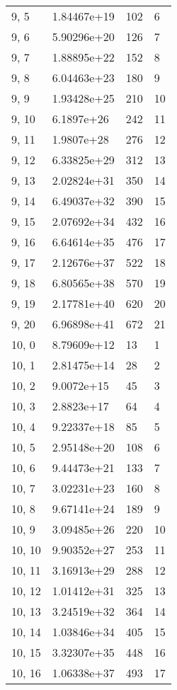 \begin{table}
\begin{tabular}{llll}
9, 5   &  1.84467e+19 &  102 &     6 \\
9, 6   &  5.90296e+20 &  126 &     7 \\
9, 7   &  1.88895e+22 &  152 &     8 \\
9, 8   &  6.04463e+23 &  180 &     9 \\
9, 9   &  1.93428e+25 &  210 &    10 \\
9, 10  &   6.1897e+26 &  242 &    11 \\
9, 11  &   1.9807e+28 &  276 &    12 \\
9, 12  &  6.33825e+29 &  312 &    13 \\
9, 13  &  2.02824e+31 &  350 &    14 \\
9, 14  &  6.49037e+32 &  390 &    15 \\
9, 15  &  2.07692e+34 &  432 &    16 \\
9, 16  &  6.64614e+35 &  476 &    17 \\
9, 17  &  2.12676e+37 &  522 &    18 \\
9, 18  &  6.80565e+38 &  570 &    19 \\
9, 19  &  2.17781e+40 &  620 &    20 \\
9, 20  &  6.96898e+41 &  672 &    21 \\
10, 0  &  8.79609e+12 &   13 &     1 \\
10, 1  &  2.81475e+14 &   28 &     2 \\
10, 2  &   9.0072e+15 &   45 &     3 \\
10, 3  &   2.8823e+17 &   64 &     4 \\
10, 4  &  9.22337e+18 &   85 &     5 \\
10, 5  &  2.95148e+20 &  108 &     6 \\
10, 6  &  9.44473e+21 &  133 &     7 \\
10, 7  &  3.02231e+23 &  160 &     8 \\
10, 8  &  9.67141e+24 &  189 &     9 \\
10, 9  &  3.09485e+26 &  220 &    10 \\
10, 10 &  9.90352e+27 &  253 &    11 \\
10, 11 &  3.16913e+29 &  288 &    12 \\
10, 12 &  1.01412e+31 &  325 &    13 \\
10, 13 &  3.24519e+32 &  364 &    14 \\
10, 14 &  1.03846e+34 &  405 &    15 \\
10, 15 &  3.32307e+35 &  448 &    16 \\
10, 16 &  1.06338e+37 &  493 &    17 \\

\end{tabular}
\end{table}
